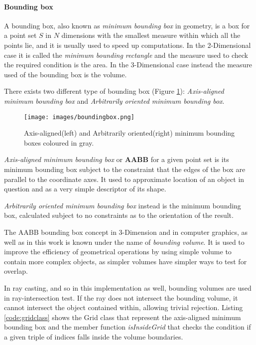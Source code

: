 \documentclass[12pt,a4paper]{extarticle}
\newcommand{\linespace}{\vspace{8pt}}
\begin{document}
\paragraph{Bounding box}

A bounding box, also known as \textit{minimum bounding box} in geometry, is a box for a point set $S$ in $N$ dimensions with the smallest measure within which all the points lie, and it is usually used to speed up computations. In the 2-Dimensional case it is called the \textit{minimum bounding rectangle} and the measure used to check the required condition is the area. In the 3-Dimensional case instead the measure used of the bounding box is the volume.
\linespace

There exists two different type of bounding box (Figure \ref{fig:boundingbox}): \textit{Axis-aligned minimum bounding box} and \textit{Arbitrarily oriented minimum bounding box}.

\begin{figure}[hbtp]
\centering
\texttt{[image: images/boundingbox.png]}
\caption{Axis-aligned(left) and Arbitrarily oriented(right) minimum bounding boxes coloured in gray.}
\label{fig:boundingbox}
\end{figure}


\textit{Axis-aligned minimum bounding box} or \textbf{AABB} for a given point set is its minimum bounding box subject to the constraint that the edges of the box are parallel to the coordinate axes. It used to approximate location of an object in question and as a very simple descriptor of its shape.

\textit{Arbitrarily oriented minimum bounding box} instead is the minimum bounding box, calculated subject to no constraints as to the orientation of the result.
\linespace

The AABB bounding box concept in 3-Dimension and in computer graphics, as well as in this work is known under the name of \textit{bounding volume}. It is used to improve the efficiency of geometrical operations by using simple volume to contain more complex objects, as simpler volumes have simpler ways to test for overlap.

In ray casting, and so in this implementation as well, bounding volumes are used in ray-intersection test. If the ray does not intersect the bounding volume, it cannot intersect the object contained within, allowing trivial rejection. Listing \ref{code:gridclass} shows the Grid class that represent the axis-aligned minimum bounding box and the member function \textit{isInsideGrid} that checks the condition if a given triple of indices falls inside the volume boundaries.
\end{document}
